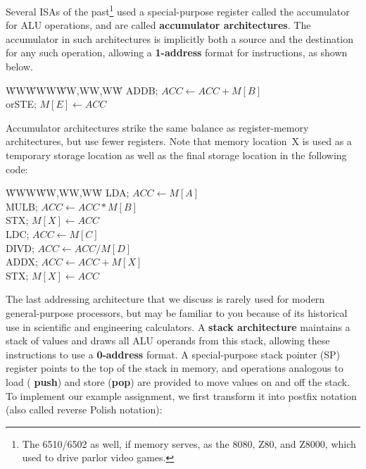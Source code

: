 Several ISAs of the past\footnote{The 6510/6502 as well, if memory
serves, as the 8080, Z80, and Z8000, which used to drive parlor video
games.}  used a special-purpose register called the accumulator for
ALU operations, and are called {\bf accumulator architectures}.  The
accumulator in such architectures is implicitly both a source and the
destination for any such operation, allowing a {\bf \mbox{1-address}}
format for instructions, as shown below.
%
\vspace{-6pt}\begin{tabbing}
\hspace{.5in}\=WW\=WWW\=WW,WW,WW\=\kill
\>\>ADD\>B\>; $ACC \leftarrow ACC + M[B]$\\
\>or\>ST\>E\>; $M[E] \leftarrow ACC$
\end{tabbing}\vspace{-6pt}
%
Accumulator architectures strike the same balance as register-memory
architectures, but use fewer registers.  Note that memory location~X
is used as a temporary storage location as well as the final storage
location in the following code:
%
\vspace{-6pt}\begin{tabbing}
\hspace{.5in}\=WWW\=WW,WW,WW\=\kill
\>LD\>A\>; $ACC \leftarrow M[A]$\\
\>MUL\>B\>; $ACC \leftarrow ACC * M[B]$\\
\>ST\>X\>; $M[X] \leftarrow ACC$\\
\>LD\>C\>; $ACC \leftarrow M[C]$\\
\>DIV\>D\>; $ACC \leftarrow ACC / M[D]$\\
\>ADD\>X\>; $ACC \leftarrow ACC + M[X]$\\
\>ST\>X\>; $M[X] \leftarrow ACC$
\end{tabbing}\vspace{-6pt}
%
The last addressing architecture that we discuss is rarely used for
modern general-purpose processors, but may be familiar to
you because of its historical use in scientific and engineering calculators.
%
A {\bf stack architecture}
maintains a stack of values and draws all ALU operands from this
stack, allowing these instructions to use a {\bf \mbox{0-address}}
format.  A special-purpose stack pointer (SP) register points to the
top of the stack in memory, and operations analogous to load ({\bf
push}) and store ({\bf pop}) are provided to move values on and off
the stack.  To implement our example assignment, we first transform it
into postfix notation (also called reverse Polish notation):


